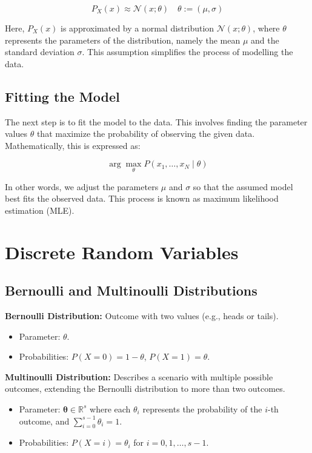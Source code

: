 \[
P_X(x) \approx \mathcal{N}(x; \theta) \quad \theta := (\mu, \sigma)
\]

Here, \(P_X(x)\) is approximated by a normal distribution \(\mathcal{N}(x; \theta)\), where \(\theta\) represents the parameters of the distribution, namely the mean \(\mu\) and the standard deviation \(\sigma\). This assumption simplifies the process of modelling the data.

\subsection{Fitting the Model}

The next step is to fit the model to the data. This involves finding the parameter values \(\theta\) that maximize the probability of observing the given data. Mathematically, this is expressed as:

\[
\arg \max_{\theta} P(x_1, \ldots, x_N \mid \theta)
\]

In other words, we adjust the parameters \(\mu\) and \(\sigma\) so that the assumed model best fits the observed data. This process is known as maximum likelihood estimation (MLE).\\











\section{Discrete Random Variables}


\subsection{Bernoulli and Multinoulli Distributions}
\textbf{Bernoulli Distribution:} Outcome with two values (e.g., heads or tails).
\begin{itemize}
    \item Parameter: \(\theta\).
    \item Probabilities: \(P(X = 0) = 1 - \theta\), \(P(X = 1) = \theta\).
\end{itemize}

\textbf{Multinoulli Distribution:} Describes a scenario with multiple possible outcomes, extending the Bernoulli distribution to more than two outcomes.
\begin{itemize}
    \item Parameter: \(\bm{\theta} \in \mathbb{R}^s\) where each \(\theta_i\) represents the probability of the \(i\)-th outcome, and \(\sum_{i=0}^{s-1} \theta_i = 1\).
    \item Probabilities: \(P(X = i) = \theta_i\) for \(i = 0, 1, \ldots, s-1\).
\end{itemize}

